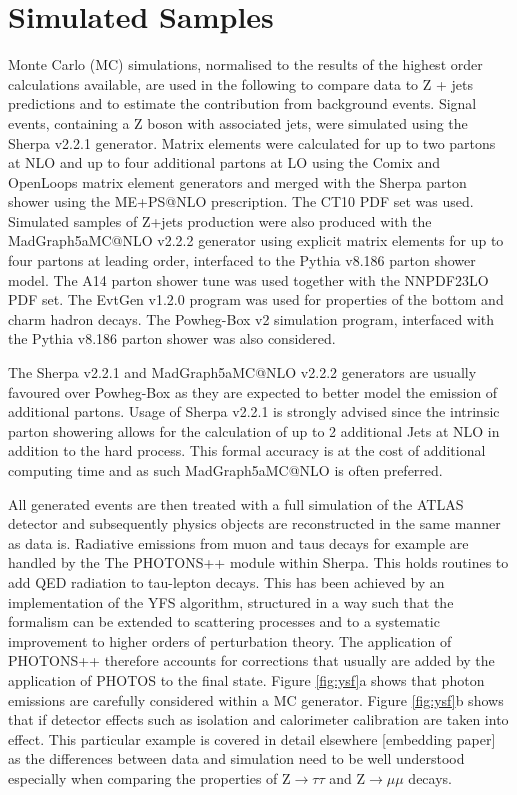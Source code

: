 \section{Simulated Samples}
\label{sec:theory}

Monte Carlo (MC) simulations, normalised to the results of the highest order calculations available, are used in the following to compare data to
Z + jets predictions and to estimate the contribution from background events. Signal events, containing a Z boson with associated jets, were simulated using the Sherpa v2.2.1 generator.  Matrix elements were calculated for up to two partons at NLO and up to four additional partons at LO using the Comix and OpenLoops matrix element generators and merged with the Sherpa parton shower using the ME+PS@NLO prescription. The CT10 PDF set was used. Simulated samples of Z+jets production were also produced with the MadGraph5\textunderscore aMC@NLO v2.2.2 generator using explicit matrix elements for up to four partons at leading order, interfaced to the Pythia v8.186 parton shower model. The A14 parton shower tune was used together with the NNPDF23LO PDF set.  The EvtGen v1.2.0 program was used for properties of the bottom and charm hadron decays. The Powheg-Box v2 simulation program, interfaced with the Pythia v8.186 parton shower was also considered. 

The Sherpa v2.2.1 and MadGraph5\textunderscore aMC@NLO v2.2.2 generators are usually favoured over Powheg-Box as they are expected to better model the emission of additional partons. Usage of Sherpa v2.2.1 is strongly advised since the intrinsic parton showering allows for the calculation of up to 2 additional Jets at NLO in addition to the hard process. This formal accuracy is at the cost of additional computing time and as such MadGraph5\textunderscore aMC@NLO is often preferred. 

All generated events are then treated with a full simulation of the ATLAS detector and subsequently physics objects are reconstructed in the same manner as data is. Radiative emissions from muon and taus decays for example are handled by the The PHOTONS++ module within Sherpa. This holds routines to add QED radiation to tau-lepton decays. This has been achieved by an implementation of the YFS algorithm, structured in a way such that the formalism can be extended to scattering processes and to a systematic improvement to higher orders of perturbation theory. The application of PHOTONS++ therefore accounts for corrections that usually are added by the application of PHOTOS to the final state. Figure \ref{fig:ysf}a shows that photon emissions are carefully considered within a MC generator. Figure \ref{fig:ysf}b shows that if detector effects such as isolation and calorimeter calibration are taken into effect. This particular example is covered in detail elsewhere [embedding paper] as the differences between data and simulation need to be well understood especially when comparing the properties of Z$\rightarrow\tau\tau$ and Z$\rightarrow\mu\mu$ decays. 

